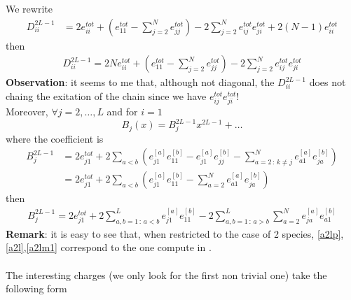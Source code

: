 \documentclass[11pt]{article}
\numberwithin{equation}{section}
\numberwithin{equation}{subsection}
\begin{document}
We rewrite
\begin{equation}
	\begin{split}
	D_{ii}^{2L-1}&=2e_{ii}^{tot}+\left(e_{11}^{tot}-\sum_{j=2}^{N}e_{jj}^{tot}\right)-2\sum_{j=2}^{N}e_{ij}^{tot}e_{ji}^{tot}+2(N-1)e_{ii}^{tot}
\end{split}
\end{equation}
then
\begin{equation}
\begin{split}
\boxed{D_{ii}^{2L-1}=	2Ne_{ii}^{tot}+\left(e_{11}^{tot}-\sum_{j=2}^{N}e_{jj}^{tot}\right)-2\sum_{j=2}^{N}e_{ij}^{tot}e_{ji}^{tot}}
	\end{split}
\end{equation}
\textbf{Observation}: it seems to me that, although not diagonal, the $D_{ii}^{2L-1}$ does not chaing the exitation of the chain since we have $e_{ij}^{tot}e_{ji}^{tot}$!\\
Moreover, $\forall j=2,\ldots,L$ and for $i=1$
\begin{equation}
	B_{j}(x)=B_{j}^{2L-1}x^{2L-1}+\ldots
\end{equation}
where the coefficient is 
\begin{equation}\label{b}
\begin{split}
	B_{j}^{2L-1}&=2e_{j1}^{tot}+2\sum_{a< b}\left(e_{j1}^{[a]}e_{11}^{[b]}-e_{j1}^{[a]}e_{jj}^{[b]}-\sum_{a=2\,:\,k\neq j}^{N}e_{a1}^{[a]}e_{ja}^{[b]}\right)\\
	&=2e_{j1}^{tot}+2\sum_{a< b}\left(e_{j1}^{[a]}e_{11}^{[b]}-\sum_{a=2}^{N}e_{a1}^{[a]}e_{ja}^{[b]}\right)
\end{split}
\end{equation}
then
\begin{equation}
\begin{split}
	\boxed{B_{j}^{2L-1}=2e_{j1}^{tot}+
	2\sum_{a,b=1\,:\, a<b}^{L}e_{j1}^{[a]}e_{11}^{[b]}-2\sum_{a,b=1\,:\, a>b}^{L}\sum_{a=2}^{N}e_{ja}^{[a]}e_{a1}^{[b]}}
\end{split}
\end{equation}
\textbf{Remark}: it is easy to see that, when restricted to the case of 2 species,  \eqref{a2lp},\eqref{a2l},\eqref{a2lm1} correspond to the one compute in \cite{frassek2020eigenstates}. \\ \\
The interesting charges (we only look for the first non trivial one) take the following form  
\end{document}
